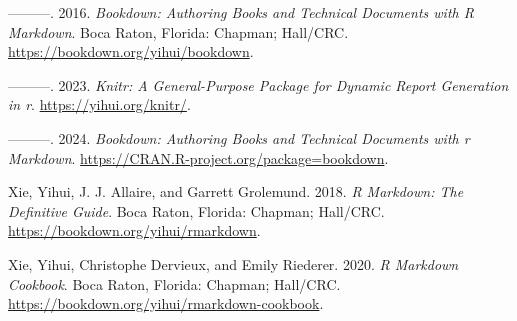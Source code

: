 \documentclass[
]{book}
\newlength{\cslhangindent}
\newlength{\cslentryspacingunit} %
\newenvironment{CSLReferences}[2] %
 {%
  \setlength{\parindent}{0pt}
  \ifodd #1
  \let\oldpar\par
  \def\par{\hangindent=\cslhangindent\oldpar}
  \fi
  \setlength{\parskip}{#2\cslentryspacingunit}
 }%
 {}
\begin{document}
\begin{CSLReferences}{1}{0}
\leavevmode{}%
---------. 2016. \emph{Bookdown: Authoring Books and Technical Documents with {R} Markdown}. Boca Raton, Florida: Chapman; Hall/CRC. \url{https://bookdown.org/yihui/bookdown}.

\leavevmode{}%
---------. 2023. \emph{Knitr: A General-Purpose Package for Dynamic Report Generation in r}. \url{https://yihui.org/knitr/}.

\leavevmode{}%
---------. 2024. \emph{Bookdown: Authoring Books and Technical Documents with r Markdown}. \url{https://CRAN.R-project.org/package=bookdown}.

\leavevmode{}%
Xie, Yihui, J. J. Allaire, and Garrett Grolemund. 2018. \emph{R Markdown: The Definitive Guide}. Boca Raton, Florida: Chapman; Hall/CRC. \url{https://bookdown.org/yihui/rmarkdown}.

\leavevmode{}%
Xie, Yihui, Christophe Dervieux, and Emily Riederer. 2020. \emph{R Markdown Cookbook}. Boca Raton, Florida: Chapman; Hall/CRC. \url{https://bookdown.org/yihui/rmarkdown-cookbook}.

\end{CSLReferences}
\end{document}
